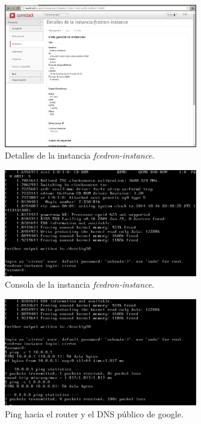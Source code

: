 \documentclass{article}
\begin{document}
\begin{figure}[h]
  \centering
    \includegraphics[width=0.75\textwidth]{img/m_043.png}
  \caption{Detalles de la instancia \emph{fcedron-instance}.}
  \label{fig:InstanceDetails}
\end{figure}	

\begin{figure}[h]
  \centering
    \includegraphics[width=0.75\textwidth]{img/m_044.png}
  \caption{Consola de la instancia \emph{fcedron-instance}.}
  \label{fig:InstanceConsoleAuth}
\end{figure}	

\begin{figure}[h]
  \centering
    \includegraphics[width=0.75\textwidth]{img/m_045.png}
  \caption{Ping hacia el router y el DNS público de google.}
  \label{fig:InstanceConsolePingRouterGoogle}
\end{figure}	
\end{document}
